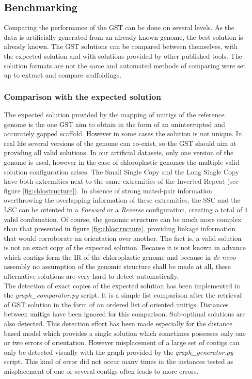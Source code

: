 \documentclass[12pt]{article}
\begin{document}
\subsection{Benchmarking} \label{sec:benchmarking}
Comparing the performance of the GST can be done on several levels. As the data is artificially generated from an already known genome, the best solution is already known. The GST solutions can be compared between themselves, with the expected solution and with solutions provided by other published tools. The solution formats are not the same and automated methods of comparing were set up to extract and compare scaffoldings. 

\subsubsection{Comparison with the expected solution}
The expected solution provided by the mapping of unitigs of the reference genome is the one GST aim to obtain in the form of an uninterrupted and accurately gapped scaffold. However in some cases the solution is not unique. In real life several versions of the genome can co-exist, so the GST should aim at providing all valid solutions. In our artificial datasets, only one version of the genome is used, however in the case of chloroplastic genomes the multiple valid solution configuration arises. The Small Single Copy and the Long Single Copy have both extremities next to the same extremities of the Inverted Repeat (see figure \ref{fig:chlostructure}). In absence of strong mated-pair information overthrowing the overlapping information of these extremities, the SSC and the LSC can be oriented in a \textit{Forward} or a \textit{Reverse} configuration, creating a total of 4 valid combination. Of course, the genomic structure can be much more complex than that presented in figure \ref{fig:chlostructure}, providing linkage information that would corroborate an orientation over another. The fact is, a valid solution is not an exact copy of the expected solution. Because it is not known in advance which contigs form the IR of the chloroplastic genome and because in \textit{de novo} assembly no assumption of the genomic structure shall be made at all, these alternative solutions are very hard to detect automatically. \\
The detection of exact copies of the expected solution has been implemented in the \textit{graph\_comparator.py} script. It is a simple list comparison after the retrieval of GST solution in the form of an ordered list of oriented unitigs. Distances between unitigs have been ignored for this comparison. Sub-optimal solutions are also detected. This detection effort has been made especially for the distance based model which provides a single solution which sometimes possesses only one or two errors of orientation. However misplacement of a large set of contigs can only be detected visually with the graph provided by the \textit{graph\_generator.py} script. This kind of error did not occur many times in the instances tested as misplacement of one or several contigs often leads to more errors.
\end{document}
